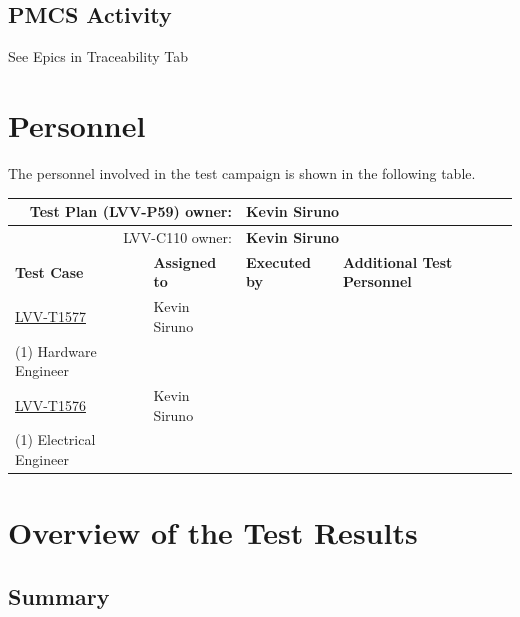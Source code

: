 \documentclass[SE,lsstdraft,STR,toc]{lsstdoc}
\begin{document}
  \subsection{PMCS Activity}
  See Epics in Traceability Tab


\newpage
\section{Personnel}
\label{sect:personnel}

The personnel involved in the test campaign is shown in the following table.

\begin{longtable}{p{3cm}p{3cm}p{3cm}p{6cm}}
\hline
\multicolumn{2}{r}{Test Plan (LVV-P59) owner:} &
\multicolumn{2}{l}{\textbf{ Kevin Siruno } }\\\hline
\multicolumn{2}{r}{ LVV-C110 owner:} &
\multicolumn{2}{l}{\textbf{
    Kevin Siruno
}
} \\\hline
\textbf{Test Case} & \textbf{Assigned to} & \textbf{Executed by} & \textbf{Additional Test Personnel} \\ \hline
\href{https://jira.lsstcorp.org/secure/Tests.jspa#/testCase/LVV-T1577}{LVV-T1577}
& {\small Kevin Siruno } & {\small  } &
\begin{minipage}[]{6cm}
\smallskip
{\small (1) Software Engineer\\
(1) Hardware Engineer
 }
\medskip
\end{minipage}
\\ \hline
\href{https://jira.lsstcorp.org/secure/Tests.jspa#/testCase/LVV-T1576}{LVV-T1576}
& {\small Kevin Siruno } & {\small  } &
\begin{minipage}[]{6cm}
\smallskip
{\small (1) Mechanical Engineer/Optical Engineer\\
(1) Electrical Engineer
 }
\medskip
\end{minipage}
\\ \hline
\end{longtable}

\newpage

\section{Overview of the Test Results}
\label{sect:overview}

\subsection{Summary}
\label{sect:summarytable}
\end{document}
